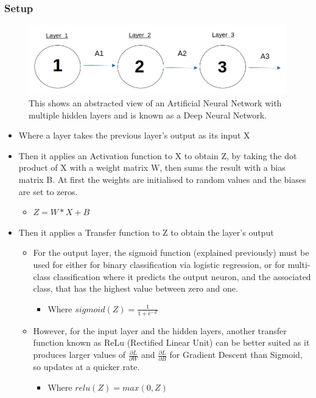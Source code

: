 \documentclass[./project-report/src/latex/project-report.tex]{subfiles}
\begin{document}
\subsubsection{Setup}

\pagebreak

\begin{figure}[h!]
\centering
\includegraphics[width=1\textwidth]{./project-report/src/images/deep-ann-diagram.png}
\caption{This shows an abstracted view of an Artificial Neural Network with multiple hidden layers and is known as a Deep Neural Network.}
\end{figure}

\begin{itemize}
    \item Where a layer takes the previous layer's output as its input X
    \item Then it applies an Activation function to X to obtain Z, by taking the dot product of X with a weight matrix W, then sums the result with a bias matrix B. At 
          first the weights are initialised to random values and the biases are set to zeros.
    \begin{itemize}
        \item $Z = W * X + B$
    \end{itemize}
    \item Then it applies a Transfer function to Z to obtain the layer's output
    \begin{itemize}
        \item For the output layer, the sigmoid function (explained previously) must be used for either for binary classification via logistic regression, or for multi-
              class classification where it predicts the output neuron, and the associated class, that has the highest value between zero and one.
        \begin{itemize}
            \item Where $sigmoid(Z) = \frac{1}{1+e^{-Z}}$
        \end{itemize}
        \item However, for the input layer and the hidden layers, another transfer function known as ReLu (Rectified Linear Unit) can be better suited as it produces 
              larger values of $\frac{\partial{L}}{\partial{W}}$ and $\frac{\partial{L}}{\partial{B}}$ for Gradient Descent than Sigmoid, so updates at a quicker rate.
        \begin{itemize}
            \item Where $relu(Z) = max(0, Z)$
        \end{itemize}
    \end{itemize}
\end{itemize}
\end{document}
